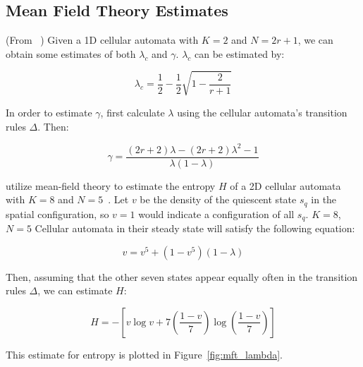 \documentclass[a4paper,11pt]{report}
\begin{document}
\begin{appendices}
\section{Mean Field Theory Estimates}
\label{appA:MFT}
(From \citeauthor{li90b}~\cite{li90b}) Given a 1D cellular automata with $K=2$ and $N = 2r+1$, we can obtain some estimates of both $\lambda_c$ and $\gamma$. $\lambda_c$ can be estimated by:

\begin{equation}
\lambda_c = \frac{1}{2} - \frac{1}{2}\sqrt{1 - \frac{2}{r+1}}
\end{equation}

In order to estimate $\gamma$, first calculate $\lambda$ using the cellular automata's transition rules $\Delta$. Then:

\begin{equation}
\gamma = \frac{(2r+2)\lambda - (2r + 2)\lambda^2 - 1}{\lambda(1-\lambda)}
\end{equation}

\pagebreak

\citeauthor{wo90} utilize mean-field theory to estimate the entropy $H$ of a 2D cellular automata with $K=8$ and $N=5$~\cite{wo90}. Let $v$ be the density of the quiescent state $s_q$ in the spatial configuration, so $v=1$ would indicate a configuration of all $s_q$. $K=8$, $N=5$ Cellular automata in their steady state will satisfy the following equation:

\begin{equation}
v = v^5 + (1 - v^5)(1- \lambda)
\end{equation}

Then, assuming that the other seven states appear equally often in the transition rules $\Delta$, we can estimate $H$:

\begin{equation}
H = -\left[ v \log v + 7\left(\frac{1-v}{7}\right)\log\left(\frac{1-v}{7}\right)\right]
\end{equation}

This estimate for entropy is plotted in Figure~\ref{fig:mft_lambda}.


\end{appendices}
\end{document}
